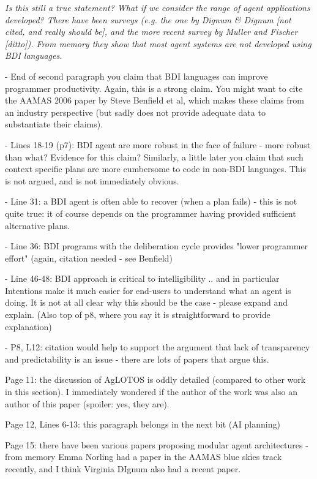 \documentclass[12pt]{article}
\newenvironment{reviews}{\bigskip\itshape}{\upshape\bigskip}
\begin{document}
\begin{reviews}
Is this still a true statement? What if we consider the range of agent applications developed? There have been surveys (e.g. the one by Dignum \& Dignum [not cited, and really should be], and the more recent survey by Muller and Fischer [ditto]). From memory they show that most agent systems are not developed using BDI languages. 

- End of second paragraph you claim that BDI languages can improve programmer productivity. Again, this is a strong claim. You might want to cite the AAMAS 2006 paper by Steve Benfield et al, which makes these claims from an industry perspective (but sadly does not provide adequate data to substantiate their claims). 

- Lines 18-19 (p7): BDI agent are more robust in the face of failure - more robust than what? Evidence for this claim?  Similarly, a little later you claim that such context specific plans are more cumbersome to code in non-BDI languages. This is not argued, and is not immediately obvious. 

- Line 31: a BDI agent is often able to recover (when a plan fails) - this is not quite true: it of course depends on the programmer having provided sufficient alternative plans. 

- Line 36: BDI programs with the deliberation cycle provides "lower programmer effort" (again, citation needed - see Benfield)

- Line 46-48: BDI approach is critical to intelligibility .. and in particular Intentions make it much easier for end-users to understand what an agent is doing. It is not at all clear why this should be the case - please expand and explain. (Also top of p8, where you say it is straightforward to provide explanation) 

- P8, L12: citation would help to support the argument that lack of transparency and predictability is an issue - there are lots of papers that argue this. 

Page 11: the discussion of AgLOTOS is oddly detailed (compared to other work in this section). I immediately wondered if the author of the work was also an author of this paper (spoiler: yes, they are).

Page 12, Lines 6-13: this paragraph belongs in the next bit (AI planning)

Page 15: there have been various papers proposing modular agent architectures - from memory Emma Norling had a paper in the AAMAS blue skies track recently, and I think Virginia DIgnum also had a recent paper. 


\end{reviews}
\end{document}
